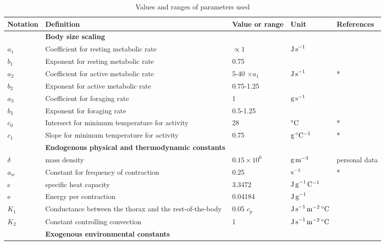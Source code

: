 \begin{sidewaystable}
\caption{Values and ranges of parameters used }
\begin{tabular}{l l l l l}
\hline
Notation& Definition & Value or range & Unit & References \\ 
\hline
&\textbf{ Body size scaling} & & &  \\ 
$a_1$ & Coefficient for resting metabolic rate  & $\propto 1$  & $\rm{J \, s}^{-1}$ & \citet{Heinrich1975} \\
$b_1$ & Exponent for resting metabolic rate  & 0.75 &  & \citet{Kleiber1947,Peters1986,Gillooly2001} \\
$a_2$ & Coefficient for active metabolic rate  & 5-40 $ \times a_1$ & $\rm{J \, s}^{-1}$ &  \citet{Bartholomew1981}* \\
$b_2$ & Exponent for active metabolic rate  & 0.75-1.25 & &  \citet{Heinrich1975} \\
$a_3$ & Coefficient for foraging rate  & 1 & $\rm{g \, s}^{-1}$  & \\
$b_3$ & Exponent  for foraging rate  & 0.5-1.25 &  &  \citet{Pawar2012, Nervo2014,Maino2015} \\
$c_0$ & Intersect for minimum temperature for activity & 28 & $^{\circ}\rm{C}$  & \citep{Bartholomew1977a}* \\
$c_1$ & Slope for minimum temperature for activity & 0.75 &  $\rm{g \,  ^{\circ}C^{-1}}$ &  \citep{Bartholomew1977a}* \\
\hline
& \textbf{Endogenous physical and thermodynamic constants} & & &  \\
$\delta $ & mass density & $0.15 \times 10^6$  & $\rm{g \, m}^{-3}$  & personal data\\
$a_w$& Constant for frequency of contraction & 0.25 & $\rm{s}^{-1}$   & \citet{Bartholomew1977b}*\\
s & specific heat capacity & 3.3472 & $\rm{J \, g}^{-1}\,\rm{C}^{-1}$ & \citet{Heinrich1975} \\
e & Energy per contraction & 0.04184 & $\rm{J \, g}^{-1}$ &\citet{Kammer1974} \\
$K_1$& Conductance between the thorax and the rest-of-the-body & 0.05 $c_p$ & $\rm{J \,s}^{-1} \, \rm{m}^{-2} \, ^{\circ}\rm{C}$  & \citet{Campbell2012} \\
$K_2$& Constant controlling convection & 1   & $\rm{J \,s}^{-1} \, \rm{m}^{-2} \, ^{\circ}\rm{C}$  & \citet{Campbell2012} \\
\hline
& \textbf{Exogenous environmental constants} & & &  \\

\end{tabular}
\end{sidewaystable}
